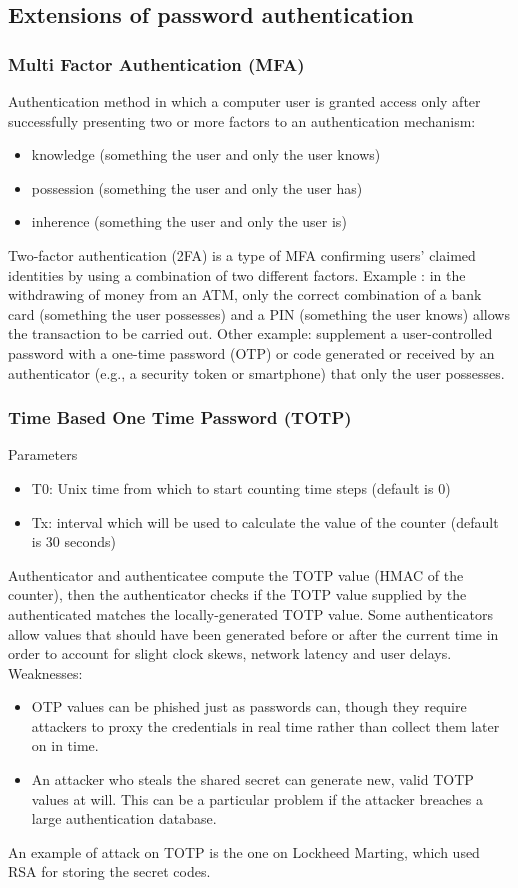 \documentclass[a4paper, 10pt, titlepage]{article}
\begin{document}
\subsection{Extensions of password authentication}
\subsubsection{Multi Factor Authentication (MFA)}
Authentication method in which a computer user is granted access only after successfully presenting two or more factors to an authentication mechanism:
\begin{itemize}
\item knowledge (something the user and only the user knows)
\item possession (something the user and only the user has)
\item inherence (something the user and only the user is)
\end{itemize}
Two-factor authentication (2FA) is a type of MFA confirming users' claimed identities by using a combination of two different factors. Example : in the withdrawing of money from an ATM, only the correct combination of a bank card (something the user possesses) and a PIN (something the user knows) allows the transaction to be carried out. Other example: supplement a user-controlled password with a one-time password (OTP) or code generated or received by an authenticator (e.g., a security token or smartphone) that only the user possesses.

\subsubsection{Time Based One Time Password (TOTP)}
Parameters
\begin{itemize}
\item T0: Unix time from which to start counting time steps (default is 0)
\item Tx: interval which will be used to calculate the value of the counter (default is 30 seconds)
\end{itemize}
Authenticator and authenticatee compute the TOTP value (HMAC of the counter), then the authenticator checks if the TOTP value supplied by the authenticated matches the locally-generated TOTP value. Some authenticators allow values that should have been generated before or after the current time in order to account for slight clock skews, network latency and user delays. \\
Weaknesses:
\begin{itemize}
\item OTP values can be phished just as passwords can, though they require attackers to proxy the credentials in real time rather than collect them later on in time.
\item An attacker who steals the shared secret can generate new, valid TOTP values at will. This can be a particular problem if the attacker breaches a large authentication database.
\end{itemize}  
An example of attack on TOTP is the one on Lockheed Marting, which used RSA for storing the secret codes.
\end{document}
